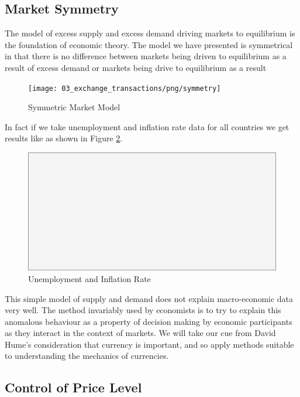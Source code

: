 \subsection{Market Symmetry}

The model of excess supply and excess demand driving markets to equilibrium is the foundation of
economic theory. The model we have presented is symmetrical in that there is no difference between
markets being driven to equilibrium as a result of excess demand or markets being drive to
equilibrium as a result  

\begin{figure}[H]
\centering
\texttt{[image: 03\_exchange\_transactions/png/symmetry]}
\caption{Symmetric Market Model}
\label{fig:symmetric_market_model}
\end{figure}

In fact if we take unemployment and inflation rate data for all countries we get results like as
shown in Figure \ref{fig:ui_summary}.

\begin{figure}[H]
\centering
\includegraphics[scale=0.48]{blank}
\caption{Unemployment and Inflation Rate}
\label{fig:ui_summary}
\end{figure}

This simple model of supply and demand does not explain macro-economic data very well. The method
invariably used by economists is to try to explain this anomalous behaviour as a property of
decision making by economic participants as they interact in the context of markets. We will take
our cue from David Hume's consideration that currency is important, and so apply methods suitable to
understanding the mechanics of currencies.

\subsection{Control of Price Level}

